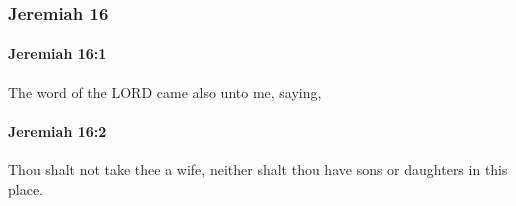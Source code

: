 	\subsubsection{Jeremiah 16} %
		\label{JEREMIAH-16}

		\paragraph{Jeremiah 16:1} %
			\label{JEREMIAH-16-1}

			The word of the LORD came also unto me, saying,


		\paragraph{Jeremiah 16:2} %
			\label{JEREMIAH-16-2}

			Thou shalt not take thee a wife, neither shalt thou have sons or daughters in this place.

